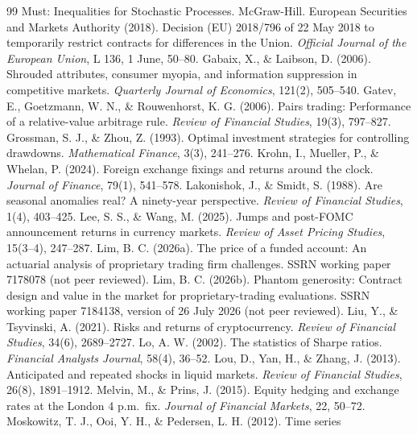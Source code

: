 \documentclass[11pt]{article}
\begin{document}
\begin{thebibliography}{99}
{Must: Inequalities for Stochastic Processes}. McGraw-Hill.
 European Securities and Markets Authority (2018). Decision (EU) 2018/796 of 22 May
2018 to temporarily restrict contracts for differences in the Union. \emph{Official Journal of the European
Union}, L 136, 1 June, 50--80.
 Gabaix, X., \& Laibson, D. (2006). Shrouded attributes, consumer
myopia, and information suppression in competitive markets. \emph{Quarterly Journal of Economics}, 121(2), 505--540.
 Gatev, E., Goetzmann, W. N., \& Rouwenhorst, K. G. (2006). Pairs trading:
Performance of a relative-value arbitrage rule. \emph{Review of Financial Studies}, 19(3), 797--827.
 Grossman, S. J., \& Zhou, Z. (1993). Optimal investment
strategies for controlling drawdowns. \emph{Mathematical Finance}, 3(3), 241--276.
 Krohn, I., Mueller, P., \& Whelan, P. (2024). Foreign exchange fixings and
returns around the clock. \emph{Journal of Finance}, 79(1), 541--578.
 Lakonishok, J., \& Smidt, S. (1988). Are seasonal anomalies
real? A ninety-year perspective. \emph{Review of Financial Studies}, 1(4), 403--425.
 Lee, S. S., \& Wang, M. (2025). Jumps and post-FOMC announcement returns in
currency markets. \emph{Review of Asset Pricing Studies}, 15(3--4), 247--287.
 Lim, B. C. (2026a). The price of a funded account: An actuarial analysis of
proprietary trading firm challenges. SSRN working paper 7178078 (not peer reviewed).
 Lim, B. C. (2026b). Phantom generosity: Contract design and value in the market
for proprietary-trading evaluations. SSRN working paper 7184138, version of 26 July 2026 (not peer reviewed).
 Liu, Y., \& Tsyvinski, A. (2021). Risks and returns of cryptocurrency.
\emph{Review of Financial Studies}, 34(6), 2689--2727.
 Lo, A. W. (2002). The statistics of Sharpe ratios. \emph{Financial Analysts Journal},
58(4), 36--52.
 Lou, D., Yan, H., \& Zhang, J. (2013). Anticipated and repeated shocks in
liquid markets. \emph{Review of Financial Studies}, 26(8), 1891--1912.
 Melvin, M., \& Prins, J. (2015). Equity hedging and exchange rates at
the London 4 p.m.\ fix. \emph{Journal of Financial Markets}, 22, 50--72.
 Moskowitz, T. J., Ooi, Y. H., \& Pedersen, L. H. (2012). Time series

\end{thebibliography}
\end{document}
